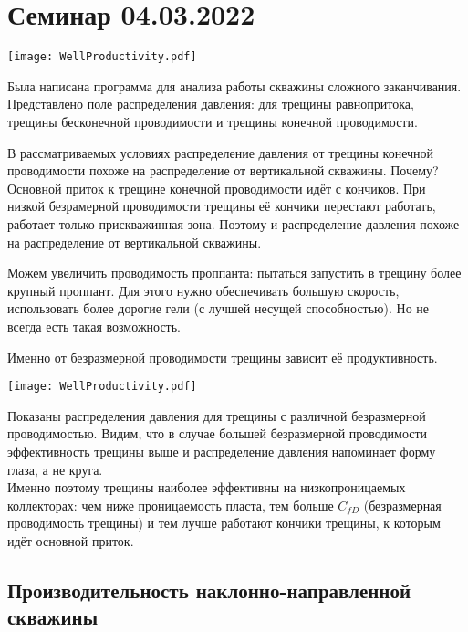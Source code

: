 \documentclass[main.tex]{subfiles}
\begin{document}
\section{Семинар 04.03.2022}

\texttt{[image: WellProductivity.pdf]}

Была написана программа для анализа работы скважины сложного заканчивания. Представлено поле распределения давления: для трещины равнопритока, трещины бесконечной проводимости и трещины конечной проводимости.

В рассматриваемых условиях распределение давления от трещины конечной проводимости похоже на распределение от вертикальной скважины. Почему?\\

Основной приток к трещине конечной проводимости идёт с кончиков. При низкой безрамерной проводимости трещины её кончики перестают работать, работает только прискважинная зона. Поэтому и распределение давления похоже на распределение от вертикальной скважины.

Можем увеличить проводимость проппанта: пытаться запустить в трещину более крупный проппант. Для этого нужно обеспечивать большую скорость, использовать более дорогие гели (с лучшей несущей способностью). Но не всегда есть такая возможность.

Именно от безразмерной проводимости трещины зависит её продуктивность.

\texttt{[image: WellProductivity.pdf]}

Показаны распределения давления для трещины с различной безразмерной проводимостью. Видим, что в случае большей безразмерной проводимости эффективность трещины выше и распределение давления напоминает форму глаза, а не круга.\\

Именно поэтому трещины наиболее эффективны на низкопроницаемых коллекторах: чем ниже проницаемость пласта, тем больше $C_{fD}$ (безразмерная проводимость трещины) и тем лучше работают кончики трещины, к которым идёт основной приток.

\subsection{Производительность наклонно-направленной скважины}
\end{document}
